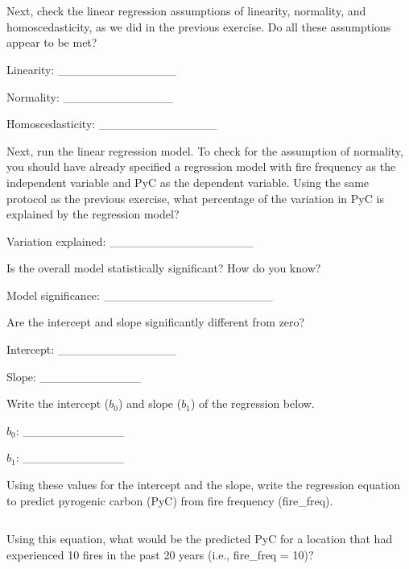\documentclass[
  openany]{krantz}
\begin{document}
\begin{verbatim}








\end{verbatim}

Next, check the linear regression assumptions of linearity, normality, and homoscedasticity, as we did in the previous exercise.
Do all these assumptions appear to be met?

Linearity: \_\_\_\_\_\_\_\_\_\_\_\_\_\_

Normality: \_\_\_\_\_\_\_\_\_\_\_\_\_

Homoscedasticity: \_\_\_\_\_\_\_\_\_\_\_\_\_\_

Next, run the linear regression model.
To check for the assumption of normality, you should have already specified a regression model with fire frequency as the independent variable and PyC as the dependent variable.
Using the same protocol as the previous exercise, what percentage of the variation in PyC is explained by the regression model?

Variation explained: \_\_\_\_\_\_\_\_\_\_\_\_\_\_\_\_\_

Is the overall model statistically significant?
How do you know?

Model significance: \_\_\_\_\_\_\_\_\_\_\_\_\_\_\_\_\_\_\_\_

Are the intercept and slope significantly different from zero?

Intercept: \_\_\_\_\_\_\_\_\_\_\_\_\_\_

Slope: \_\_\_\_\_\_\_\_\_\_\_\_

Write the intercept (\(b_{0}\)) and slope (\(b_{1}\)) of the regression below.

\(b_{0}\): \_\_\_\_\_\_\_\_\_\_\_\_

\(b_{1}\): \_\_\_\_\_\_\_\_\_\_\_\_

Using these values for the intercept and the slope, write the regression equation to predict pyrogenic carbon (PyC) from fire frequency (fire\_freq).

\begin{verbatim}

\end{verbatim}

Using this equation, what would be the predicted PyC for a location that had experienced 10 fires in the past 20 years (i.e., fire\_freq = 10)?

\begin{verbatim}

\end{verbatim}
\end{document}
